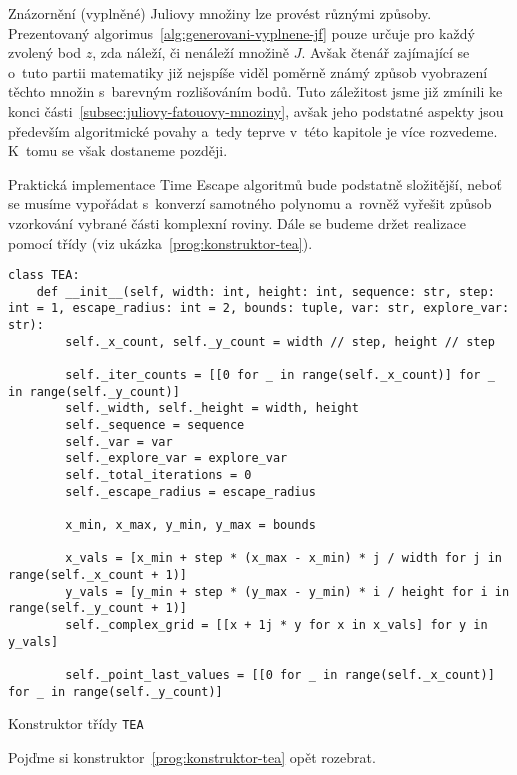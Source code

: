 Znázornění (vyplněné) Juliovy množiny lze provést různými způsoby. Prezentovaný algorimus~\ref{alg:generovani-vyplnene-jf} pouze určuje pro každý zvolený bod $z$, zda náleží, či nenáleží množině $J$. Avšak čtenář zajímající se o~tuto partii matematiky již nejspíše viděl poměrně známý způsob vyobrazení těchto množin s~barevným rozlišováním bodů. Tuto záležitost jsme již zmínili ke konci části~\ref{subsec:juliovy-fatouovy-mnoziny}, avšak jeho podstatné aspekty jsou především algoritmické povahy a~tedy teprve v~této kapitole je více rozvedeme. K~tomu se však dostaneme později.

Praktická implementace Time Escape algoritmů bude podstatně složitější, neboť se musíme vypořádat s~konverzí samotného polynomu a~rovněž vyřešit způsob vzorkování vybrané části komplexní roviny. Dále se budeme držet realizace pomocí třídy (viz ukázka~\ref{prog:konstruktor-tea}).
\begin{program}[h]
\begin{lstlisting}[style=python]
class TEA:
    def __init__(self, width: int, height: int, sequence: str, step: int = 1, escape_radius: int = 2, bounds: tuple, var: str, explore_var: str):
        self._x_count, self._y_count = width // step, height // step
        
        self._iter_counts = [[0 for _ in range(self._x_count)] for _ in range(self._y_count)]
        self._width, self._height = width, height
        self._sequence = sequence
        self._var = var
        self._explore_var = explore_var
        self._total_iterations = 0
        self._escape_radius = escape_radius

        x_min, x_max, y_min, y_max = bounds

        x_vals = [x_min + step * (x_max - x_min) * j / width for j in range(self._x_count + 1)]
        y_vals = [y_min + step * (y_max - y_min) * i / height for i in range(self._y_count + 1)]
        self._complex_grid = [[x + 1j * y for x in x_vals] for y in y_vals]

        self._point_last_values = [[0 for _ in range(self._x_count)] for _ in range(self._y_count)]
\end{lstlisting}
    \caption{Konstruktor třídy \texttt{TEA}}
    \label{prog:konstruktor-tea}
\end{program}
Pojďme si konstruktor~\ref{prog:konstruktor-tea} opět rozebrat.
